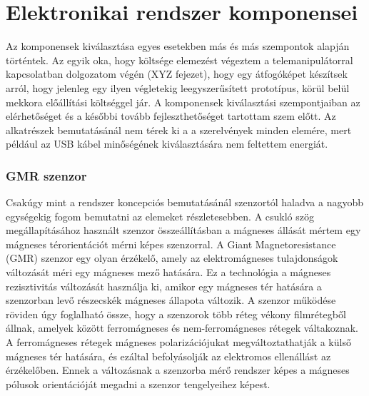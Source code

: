 \section{Elektronikai rendszer komponensei}

Az komponensek kiválasztása egyes esetekben más és más szempontok alapján történtek. Az egyik oka, hogy költsége elemezést végeztem a telemanipulátorral kapcsolatban dolgozatom végén (XYZ fejezet), hogy egy átfogóképet készítsek arról, hogy jelenleg egy ilyen végletekig leegyszerűsített prototípus, körül belül mekkora előállítási költséggel jár. A komponensek kiválasztási szempontjaiban az elérhetőséget és a későbbi tovább fejleszthetőséget tartottam szem előtt. Az alkatrészek bemutatásánál nem térek ki a a szerelvények minden elemére, mert például az USB kábel minőségének kiválasztására nem feltettem energiát.

\subsubsection{GMR szenzor}

Csakúgy mint a rendszer koncepciós bemutatásánál szenzortól haladva a nagyobb egységekig fogom bemutatni az elemeket részletesebben. A csukló szög megállapításához használt szenzor összeállításban a mágneses állását mértem egy mágneses térorientációt mérni képes szenzorral. A Giant Magnetoresistance (GMR) szenzor egy olyan érzékelő, amely az elektromágneses tulajdonságok változását méri egy mágneses mező hatására. Ez a technológia a mágneses rezisztivitás változását használja ki, amikor egy mágneses tér hatására a szenzorban levő részecskék mágneses állapota változik. A szenzor működése röviden úgy foglalható össze, hogy a szenzorok több réteg vékony filmrétegből állnak, amelyek között ferromágneses és nem-ferromágneses rétegek váltakoznak. A ferromágneses rétegek mágneses polarizációjukat megváltoztathatják a külső mágneses tér hatására, és ezáltal befolyásolják az elektromos ellenállást az érzékelőben. Ennek a változásnak a szenzorba mérő rendszer képes a mágneses pólusok orientációját megadni a szenzor tengelyeihez képest.


